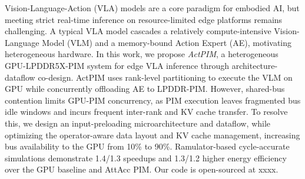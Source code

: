 Vision-Language-Action (VLA) models are a core paradigm for embodied AI, but meeting strict real-time inference on resource-limited edge platforms remains challenging. A typical VLA model cascades a relatively compute-intensive Vision-Language Model (VLM) and a memory-bound Action Expert (AE), motivating heterogeneous hardware. In this work, we propose \emph{ActPIM}, a heterogeneous GPU-LPDDR5X-PIM system for edge VLA inference through architecture-dataflow co-design. ActPIM uses rank-level partitioning to execute the VLM on GPU while concurrently offloading AE to LPDDR-PIM. However, shared-bus contention limits GPU-PIM concurrency, as PIM execution leaves fragmented bus idle windows and incurs frequent inter-rank and KV cache transfer. To resolve this, we design an input-preloading microarchitecture and dataflow, while optimizing the operator-aware data layout and KV cache management, increasing bus availability to the GPU from 10\% to 90\%. Ramulator-based cycle-accurate simulations demonstrate 1.4\texttimes{}/1.3\texttimes{} speedups and 1.3\texttimes{}/1.2\texttimes{} higher energy efficiency over the GPU baseline and AttAcc PIM. Our code is open-sourced at xxxx.

